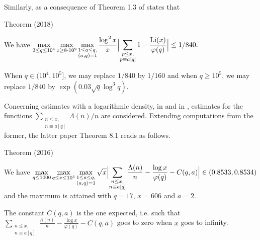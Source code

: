 Similarly, as a consequence of Theorem 1.3 of
\cite{Bennett-Martin-OBryant-Rechnitzer*18}
states that
\begin{thm}{Theorem (2018)}

  We have
  $\displaystyle
  \max_{3\le q\le 10^4}\max_{ x\ge 8\cdot 10^9}\max_{\substack{1\le a\le q,\\
  (a,q)=1}}
  \frac{\log^2 x}{x}\Bigl|
  \sum_{\substack{p\le x,\\ p\equiv a[q]}}1
  -\frac{\textrm{Li}(x)}{\varphi(q)}\Bigr|\le 1/840.
  $
  \par 
  When $q\in(10^4, 10^5]$, we may replace $1/840$ by $1/160$ and when
  $q\ge 10^5$, we may replace $1/840$ by $\exp(0.03\sqrt{q}\log^3q)$.
\end{thm}





\par 
Concerning estimates with a logarithmic density, in
\cite{Ramare*02}
and in
\cite{Ramare*12-0},
estimates for the functions
$\displaystyle\sum_{\substack{n\le x,\\ n\equiv a[q]}}\Lambda(n)/n$
are considered.
Extending computations from the former, the latter paper Theorem 8.1
reads as follows.
\begin{thm}{Theorem (2016)}

  We have
  $\displaystyle
  \max_{q\le 1000}\max_{q\le x\le 10^5}\max_{\substack{1\le a\le q,\\
  (a,q)=1}}
  \sqrt{x}\Bigl|
  \sum_{\substack{n\le x,\\ n\equiv a[q]}}\frac{\Lambda(n)}{n}
  -\frac{\log x}{\varphi(q)}-C(q,a)\Bigr|\in(0.8533,0.8534)
  $
  and the maximum is attained with $q=17$, $x=606$ and $a=2$.
\end{thm}

The constant $C(q,a)$ is the one expected, i.e. such that
$\sum_{\substack{n\le x,\\ n\equiv a[q]}}\frac{\Lambda(n)}{n}
-\frac{\log x}{\varphi(q)}-C(q,a)$ goes to
zero when $x$ goes to infinity.

